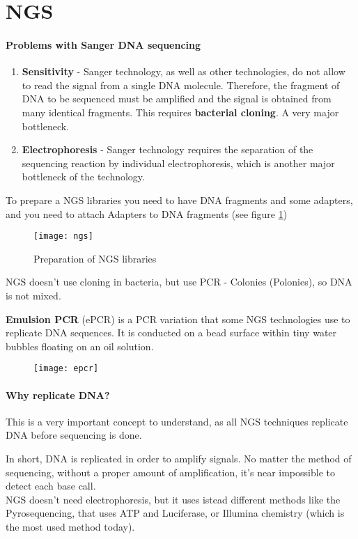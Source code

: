 \section{NGS}

\paragraph*{Problems with Sanger DNA sequencing}

\begin{enumerate}
	\item \textbf{Sensitivity} - Sanger technology, as well as other
technologies, do not allow to read the signal from a single DNA 
molecule. Therefore, the fragment of DNA to be sequenced 
must be amplified and the signal is obtained from many 
identical fragments. This requires \textbf{bacterial cloning}. 
A very major bottleneck.
	\item \textbf{Electrophoresis} - Sanger technology 
requires the separation of the sequencing 
reaction by individual electrophoresis, which 
is another major bottleneck of the technology.
\end{enumerate}


To prepare a NGS libraries you need to have DNA fragments and some adapters,
and you need to attach Adapters to DNA fragments (see figure \ref{fig:ngs})

\begin{figure}[H]
  \centering
  \texttt{[image: ngs]}
  \caption{Preparation of NGS libraries}
  \label{fig:ngs}
\end{figure}

NGS doesn't use cloning in bacteria, but use PCR - Colonies (Polonies), so DNA
is not mixed. 

\textbf{Emulsion PCR} (ePCR) is a PCR variation that some NGS technologies use to replicate DNA sequences. 
It is conducted on a bead surface within tiny water bubbles floating on an oil solution.

\begin{figure}[H]
  \centering
  \texttt{[image: epcr]}
\end{figure}

\paragraph*{Why replicate DNA?}

This is a very important concept to understand, as all NGS techniques replicate DNA before sequencing is done. 

In short, DNA is replicated in order to amplify signals. No matter the method of sequencing, without a proper amount of amplification, it's near impossible to detect each base call. \\

NGS doesn't need electrophoresis, but it uses istead different methods
like the Pyrosequencing, that uses ATP and Luciferase, or Illumina
chemistry (which is the most used method today).
